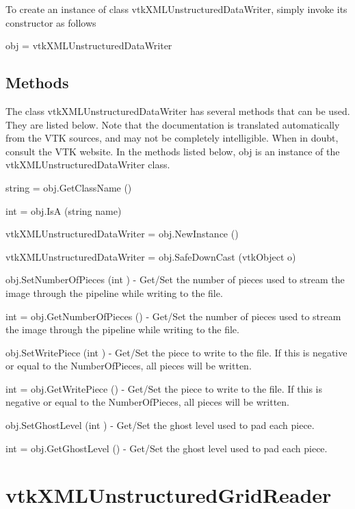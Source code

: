 To create an instance of class vtk\-X\-M\-L\-Unstructured\-Data\-Writer, simply invoke its constructor as follows \begin{DoxyVerb}  obj = vtkXMLUnstructuredDataWriter
\end{DoxyVerb}
 \hypertarget{vtkwidgets_vtkxyplotwidget_Methods}{}\subsection{Methods}\label{vtkwidgets_vtkxyplotwidget_Methods}
The class vtk\-X\-M\-L\-Unstructured\-Data\-Writer has several methods that can be used. They are listed below. Note that the documentation is translated automatically from the V\-T\-K sources, and may not be completely intelligible. When in doubt, consult the V\-T\-K website. In the methods listed below, {\ttfamily obj} is an instance of the vtk\-X\-M\-L\-Unstructured\-Data\-Writer class. 
\begin{DoxyItemize}
\item {\ttfamily string = obj.\-Get\-Class\-Name ()}  
\item {\ttfamily int = obj.\-Is\-A (string name)}  
\item {\ttfamily vtk\-X\-M\-L\-Unstructured\-Data\-Writer = obj.\-New\-Instance ()}  
\item {\ttfamily vtk\-X\-M\-L\-Unstructured\-Data\-Writer = obj.\-Safe\-Down\-Cast (vtk\-Object o)}  
\item {\ttfamily obj.\-Set\-Number\-Of\-Pieces (int )} -\/ Get/\-Set the number of pieces used to stream the image through the pipeline while writing to the file.  
\item {\ttfamily int = obj.\-Get\-Number\-Of\-Pieces ()} -\/ Get/\-Set the number of pieces used to stream the image through the pipeline while writing to the file.  
\item {\ttfamily obj.\-Set\-Write\-Piece (int )} -\/ Get/\-Set the piece to write to the file. If this is negative or equal to the Number\-Of\-Pieces, all pieces will be written.  
\item {\ttfamily int = obj.\-Get\-Write\-Piece ()} -\/ Get/\-Set the piece to write to the file. If this is negative or equal to the Number\-Of\-Pieces, all pieces will be written.  
\item {\ttfamily obj.\-Set\-Ghost\-Level (int )} -\/ Get/\-Set the ghost level used to pad each piece.  
\item {\ttfamily int = obj.\-Get\-Ghost\-Level ()} -\/ Get/\-Set the ghost level used to pad each piece.  
\end{DoxyItemize}\hypertarget{vtkio_vtkxmlunstructuredgridreader}{}\section{vtk\-X\-M\-L\-Unstructured\-Grid\-Reader}\label{vtkio_vtkxmlunstructuredgridreader}
